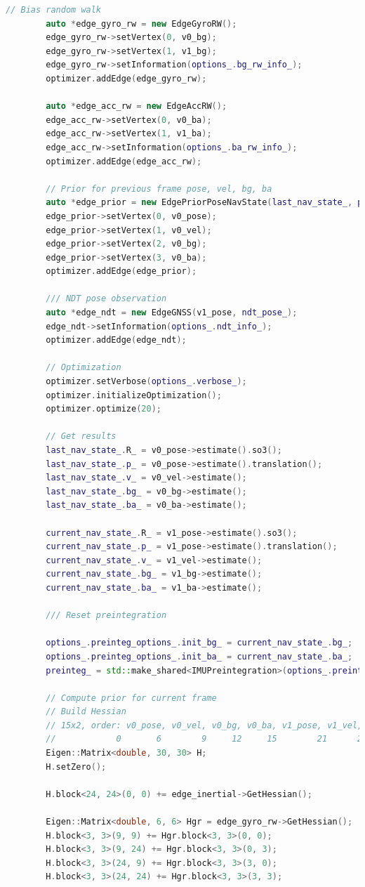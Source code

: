 \begin{lstlisting}[language=c++,caption=src/ch8/lio-preinteg/lio_preinteg.cc]
		// Bias random walk
		auto *edge_gyro_rw = new EdgeGyroRW();
		edge_gyro_rw->setVertex(0, v0_bg);
		edge_gyro_rw->setVertex(1, v1_bg);
		edge_gyro_rw->setInformation(options_.bg_rw_info_);
		optimizer.addEdge(edge_gyro_rw);
		
		auto *edge_acc_rw = new EdgeAccRW();
		edge_acc_rw->setVertex(0, v0_ba);
		edge_acc_rw->setVertex(1, v1_ba);
		edge_acc_rw->setInformation(options_.ba_rw_info_);
		optimizer.addEdge(edge_acc_rw);
		
		// Prior for previous frame pose, vel, bg, ba
		auto *edge_prior = new EdgePriorPoseNavState(last_nav_state_, prior_info_);
		edge_prior->setVertex(0, v0_pose);
		edge_prior->setVertex(1, v0_vel);
		edge_prior->setVertex(2, v0_bg);
		edge_prior->setVertex(3, v0_ba);
		optimizer.addEdge(edge_prior);
		
		/// NDT pose observation
		auto *edge_ndt = new EdgeGNSS(v1_pose, ndt_pose_);
		edge_ndt->setInformation(options_.ndt_info_);
		optimizer.addEdge(edge_ndt);
		
		// Optimization
		optimizer.setVerbose(options_.verbose_);
		optimizer.initializeOptimization();
		optimizer.optimize(20);
		
		// Get results
		last_nav_state_.R_ = v0_pose->estimate().so3();
		last_nav_state_.p_ = v0_pose->estimate().translation();
		last_nav_state_.v_ = v0_vel->estimate();
		last_nav_state_.bg_ = v0_bg->estimate();
		last_nav_state_.ba_ = v0_ba->estimate();
		
		current_nav_state_.R_ = v1_pose->estimate().so3();
		current_nav_state_.p_ = v1_pose->estimate().translation();
		current_nav_state_.v_ = v1_vel->estimate();
		current_nav_state_.bg_ = v1_bg->estimate();
		current_nav_state_.ba_ = v1_ba->estimate();
		
		/// Reset preintegration
		
		options_.preinteg_options_.init_bg_ = current_nav_state_.bg_;
		options_.preinteg_options_.init_ba_ = current_nav_state_.ba_;
		preinteg_ = std::make_shared<IMUPreintegration>(options_.preinteg_options_);
		
		// Compute prior for current frame
		// Build Hessian
		// 15x2, order: v0_pose, v0_vel, v0_bg, v0_ba, v1_pose, v1_vel, v1_bg, v1_ba
		//            0       6        9     12     15        21      24     27
		Eigen::Matrix<double, 30, 30> H;
		H.setZero();
		
		H.block<24, 24>(0, 0) += edge_inertial->GetHessian();
		
		Eigen::Matrix<double, 6, 6> Hgr = edge_gyro_rw->GetHessian();
		H.block<3, 3>(9, 9) += Hgr.block<3, 3>(0, 0);
		H.block<3, 3>(9, 24) += Hgr.block<3, 3>(0, 3);
		H.block<3, 3>(24, 9) += Hgr.block<3, 3>(3, 0);
		H.block<3, 3>(24, 24) += Hgr.block<3, 3>(3, 3);
		

\end{lstlisting}
